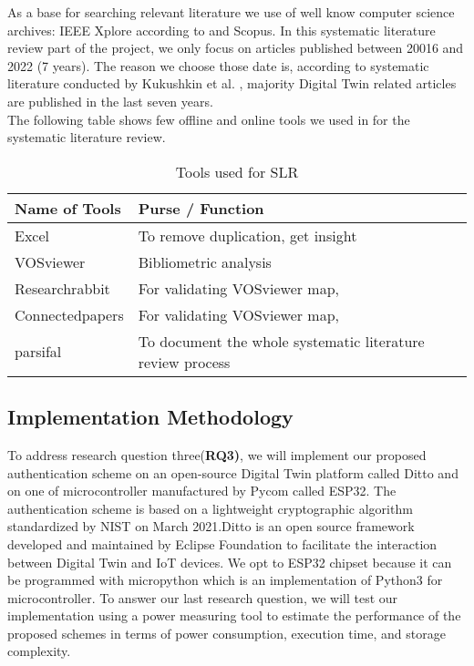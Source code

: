 As a base for searching relevant literature we use of well know computer science archives: IEEE Xplore according to \cite{kofod-petersen_how_nodate} and Scopus. In this systematic literature review part of the project, we only focus on articles published between 20016 and 2022 (7 years). The reason we choose those date is, according to systematic literature conducted by Kukushkin et al. \cite{kukushkin_digital_2022}, majority Digital Twin related articles are published in the last seven years.
\\
The following table shows few offline and online tools we used in for the systematic literature review. 
\begin{table}[!ht]
    \centering
    \begin{tabular}{|l|l|}
    \hline
        \textbf{Name of Tools} & \textbf{Purse / Function} \\ \hline
        Excel & To remove duplication, get insight \\ \hline
        VOSviewer & Bibliometric analysis \\ \hline
        Researchrabbit & For validating VOSviewer map,  \\ \hline
        Connectedpapers & For validating VOSviewer map,  \\ \hline
        parsifal & To document the whole systematic literature review process \\ \hline
    \end{tabular}
    \caption{Tools used for SLR  }
    \label{slrtools}
\end{table}

\subsection{Implementation Methodology}
To address research question three(\textbf{RQ3)}, we will implement our proposed authentication scheme on an open-source Digital Twin platform called Ditto and on one of microcontroller manufactured by Pycom called ESP32. The authentication scheme is based on a lightweight cryptographic algorithm standardized by NIST on March 2021.Ditto is an open source framework developed and maintained by Eclipse Foundation to facilitate the interaction between Digital Twin and IoT devices\cite{noauthor_eclipse_nodate}. We opt to ESP32 chipset because it can be programmed with micropython which is an implementation of Python3 for microcontroller. 
To answer our last research question, we will test our implementation using a power measuring tool to estimate the performance of the proposed schemes in terms of power consumption, execution time, and storage complexity.

